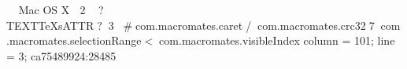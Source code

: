     Mac OS X            	   2  
     ?    TEXTTeXs                          ATTR      ?     3                    #  com.macromates.caret   /     com.macromates.crc32   7     com.macromates.selectionRange      <     com.macromates.visibleIndex  {
    column = 101;
    line = 3;
}ca75489924:28485
